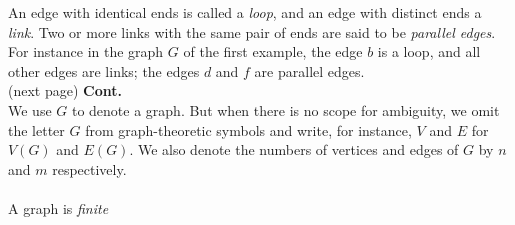 \documentclass{report}
\theoremstyle{definition}
\begin{document}
An edge with identical ends is called a \textit{loop}, and an edge with distinct ends a \textit{link}. Two or more links with the same pair of ends are said to be \textit{parallel edges}.
For instance in the graph $G$ of the first example, the edge $b$ is a loop, and all other edges are links; the edges $d$ and $f$ are parallel edges.\\
(next page)\newpage
\noindent\textbf{Cont.}\\
We use $G$ to denote a graph. But when there is no scope for ambiguity, we omit the letter $G$ from graph-theoretic symbols and write, for instance, $V$ and $E$ for $V(G)$ and $E(G)$. 
We also denote the numbers of vertices and edges of $G$ by $n$ and $m$ respectively.\\
\vspace{1mm}\\
A graph is \textit{finite}
\end{document}
